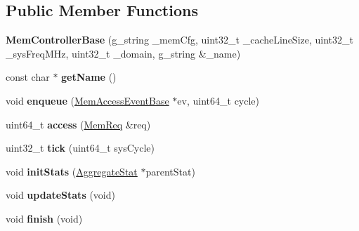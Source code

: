 \subsection*{Public Member Functions}
\begin{DoxyCompactItemize}
\item 
\hypertarget{classMemControllerBase_a3cb4e5c7ae504117be8c6ff15502dcc6}{{\bfseries Mem\-Controller\-Base} (g\-\_\-string \-\_\-mem\-Cfg, uint32\-\_\-t \-\_\-cache\-Line\-Size, uint32\-\_\-t \-\_\-sys\-Freq\-M\-Hz, uint32\-\_\-t \-\_\-domain, g\-\_\-string \&\-\_\-name)}\label{classMemControllerBase_a3cb4e5c7ae504117be8c6ff15502dcc6}

\item 
\hypertarget{classMemControllerBase_ac85a1504e9c0652e1612d59badde0032}{const char $\ast$ {\bfseries get\-Name} ()}\label{classMemControllerBase_ac85a1504e9c0652e1612d59badde0032}

\item 
\hypertarget{classMemControllerBase_a4cd70799a3c1edb0af291878f5a9a773}{void {\bfseries enqueue} (\hyperlink{classMemAccessEventBase}{Mem\-Access\-Event\-Base} $\ast$ev, uint64\-\_\-t cycle)}\label{classMemControllerBase_a4cd70799a3c1edb0af291878f5a9a773}

\item 
\hypertarget{classMemControllerBase_a5db8f1b19708c92ae85e3797bf6d6f8b}{uint64\-\_\-t {\bfseries access} (\hyperlink{structMemReq}{Mem\-Req} \&req)}\label{classMemControllerBase_a5db8f1b19708c92ae85e3797bf6d6f8b}

\item 
\hypertarget{classMemControllerBase_ac926fe00ab34f86ed5f2fb398668f978}{uint32\-\_\-t {\bfseries tick} (uint64\-\_\-t sys\-Cycle)}\label{classMemControllerBase_ac926fe00ab34f86ed5f2fb398668f978}

\item 
\hypertarget{classMemControllerBase_a9703e0e4f3b0846c3560f10f6e11492e}{void {\bfseries init\-Stats} (\hyperlink{classAggregateStat}{Aggregate\-Stat} $\ast$parent\-Stat)}\label{classMemControllerBase_a9703e0e4f3b0846c3560f10f6e11492e}

\item 
\hypertarget{classMemControllerBase_ab575ace5f9c765308ab6aa3ca64d5559}{void {\bfseries update\-Stats} (void)}\label{classMemControllerBase_ab575ace5f9c765308ab6aa3ca64d5559}

\item 
\hypertarget{classMemControllerBase_a4c23cd0fbf82abc036fa0050cf752d60}{void {\bfseries finish} (void)}\label{classMemControllerBase_a4c23cd0fbf82abc036fa0050cf752d60}


\end{DoxyCompactItemize}
